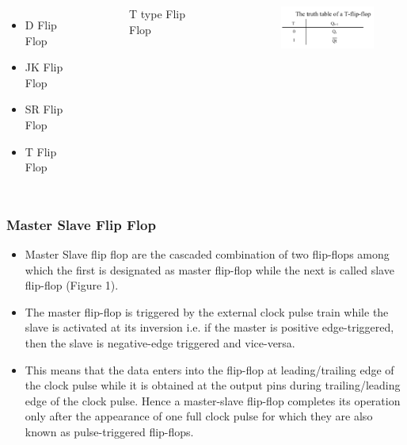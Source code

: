 \documentclass{beamer}
\begin{document}
\begin{frame}

    \begin{columns}
    
    \begin{itemize}
    
    
    \item D Flip Flop 
    \item JK Flip Flop
    \item SR Flip Flop
    \item T Flip Flop\pause
    
\end{itemize}

    \begin{figure}[H]
        \centering
        
        
        
        
        \caption{T type Flip Flop}
        \label{fig:my_label}
    \end{figure}\pause
    
    \begin{figure}[H]
        \centering
        
        \includegraphics[width=100pt]{name/abc2.png}
        
        

        \label{fig:my_label}
    \end{figure}\pause
    
    
    \end{columns}
\end{frame}

\begin{frame}
\frametitle{Master Slave Flip Flop}
\begin{itemize}
 \item<1-> Master Slave flip flop are the cascaded combination of two flip-flops among which the first is designated as master flip-flop while the next is called slave flip-flop (Figure 1).
 \item<2-> The master flip-flop is triggered by the external clock pulse train while the slave is activated at its inversion i.e. if the master is positive edge-triggered, then the slave is negative-edge triggered and vice-versa.
 \item<3-> This means that the data enters into the flip-flop at leading/trailing edge of the clock pulse while it is obtained at the output pins during trailing/leading edge of the clock pulse. Hence a master-slave flip-flop completes its operation only after the appearance of one full clock pulse for which they are also known as \alert{pulse-triggered} flip-flops.
 \end{itemize}

\end{frame}
\end{document}
